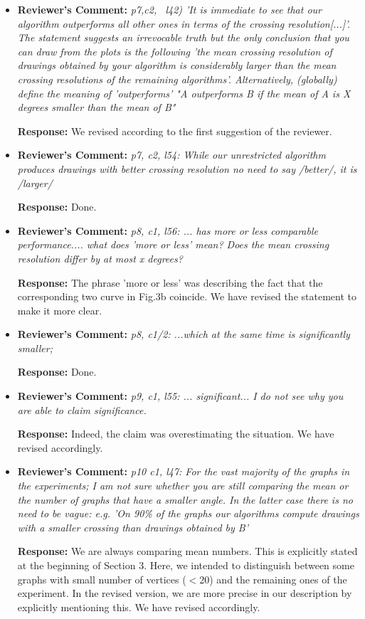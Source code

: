 \documentclass{article}
\newcommand{\rcomment}[1]{\vspace{0.3cm} \item \textbf{Reviewer's Comment:} {\em #1}}
\newcommand{\response}{\vspace{0.2cm} \textbf{Response: }}
\begin{document}
\begin{itemize}
\response{We agree with the reviewer that some of our statements might be questionable. So, in the following, we have addressed each of the reviewer's specific comments in order to improve the presentation.}

\rcomment{p7,c2, ~l42) 'It is immediate to see that our algorithm outperforms all other ones in terms of the crossing resolution[...]'. The statement suggests an irrevocable truth but the only conclusion that you can draw from the plots is the following 'the mean crossing resolution of drawings obtained by your algorithm is considerably larger than the mean crossing resolutions of the remaining algorithms'. Alternatively, (globally) define the meaning of 'outperforms' "A outperforms B if the mean of A is X degrees smaller than the mean of B"}

\response{We revised according to the first suggestion of the reviewer.}

\rcomment{p7, c2, l54: While our unrestricted algorithm produces drawings with better crossing resolution no need to say /better/, it is /larger/}

\response{Done.}

\rcomment{p8, c1, l56: ... has more or less comparable performance.... what does 'more or less' mean? Does the mean crossing resolution differ by at most x degrees?}

\response{The phrase 'more or less' was describing the fact that the corresponding two curve in Fig.3b coincide. We have revised the statement to make it more clear.}

\rcomment{p8, c1/2: ...which at the same time is significantly smaller;}

\response{Done.}

\rcomment{p9, c1, l55: ... significant... I do not see why you are able to claim significance.}

\response{Indeed, the claim was overestimating the situation. We have revised accordingly.}

\rcomment{p10 c1, l47: For the vast majority of the graphs in the experiments; I am not sure whether you are still comparing the mean or the number of graphs that have a smaller angle. In the latter case there is no need to be vague: e.g. 'On 90\% of the graphs our algorithms compute drawings with a smaller crossing than drawings obtained by B'}

\response{We are always comparing mean numbers. This is explicitly stated at the beginning of Section 3. Here, we intended to distinguish between some graphs with small number of vertices ($<20$) and the remaining ones of the experiment. In the revised version, we are more precise in our description by explicitly mentioning this. We have revised accordingly.}



\end{itemize}
\end{document}
